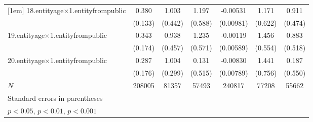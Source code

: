 {\begin{tabular}{l*{6}{c}}
[1em]
18.entityage$\times$1.entityfrompublic&       0.380\sym{**} &       1.003\sym{*}  &       1.197         &    -0.00531         &       1.171         &       0.911         \\
            &     (0.133)         &     (0.442)         &     (0.588)         &   (0.00981)         &     (0.622)         &     (0.474)         \\
[1em]
19.entityage$\times$1.entityfrompublic&       0.343         &       0.938\sym{*}  &       1.235\sym{*}  &    -0.00119         &       1.456\sym{*}  &       0.883         \\
            &     (0.174)         &     (0.457)         &     (0.571)         &   (0.00589)         &     (0.554)         &     (0.518)         \\
[1em]
20.entityage$\times$1.entityfrompublic&       0.287         &       1.004\sym{**} &       0.131         &    -0.00830         &       1.441         &       0.187         \\
            &     (0.176)         &     (0.299)         &     (0.515)         &   (0.00789)         &     (0.756)         &     (0.550)         \\
\hline
\(N\)       &      208005         &       81357         &       57493         &      240817         &       77208         &       55662         \\
\hline\hline
\multicolumn{7}{l}{\footnotesize Standard errors in parentheses}\\
\multicolumn{7}{l}{\footnotesize \sym{*} \(p<0.05\), \sym{**} \(p<0.01\), \sym{***} \(p<0.001\)}\\
\end{tabular}
}
